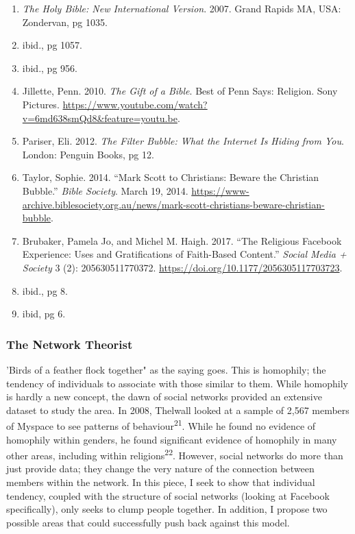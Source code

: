 \documentclass[]{article}
\providecommand{\tightlist}{%
  \setlength{\itemsep}{0pt}\setlength{\parskip}{0pt}}
\begin{document}
\begin{enumerate}
\def\labelenumi{\arabic{enumi}.}
\setcounter{enumi}{11}
\tightlist
\item
  \emph{The Holy Bible: New International Version}. 2007. Grand Rapids
  MA, USA: Zondervan, pg 1035.
\item
  ibid., pg 1057.
\item
  ibid., pg 956.
\item
  Jillette, Penn. 2010. \emph{The Gift of a Bible}. Best of Penn Says:
  Religion. Sony Pictures.
  \url{https://www.youtube.com/watch?v=6md638smQd8\&feature=youtu.be}.
\item
  Pariser, Eli. 2012. \emph{The Filter Bubble: What the Internet Is
  Hiding from You}. London: Penguin Books, pg 12.
\item
  Taylor, Sophie. 2014. ``Mark Scott to Christians: Beware the Christian
  Bubble.'' \emph{Bible Society}. March 19, 2014.
  \url{https://www-archive.biblesociety.org.au/news/mark-scott-christians-beware-christian-bubble}.
\item
  Brubaker, Pamela Jo, and Michel M. Haigh. 2017. ``The Religious
  Facebook Experience: Uses and Gratifications of Faith-Based Content.''
  \emph{Social Media + Society} 3 (2): 205630511770372.
  \url{https://doi.org/10.1177/2056305117703723}.
\item
  ibid., pg 8.
\item
  ibid, pg 6.
\end{enumerate}

\hypertarget{the-network-theorist}{%
\subsubsection{The Network Theorist}\label{the-network-theorist}}

'Birds of a feather flock together" as the saying goes. This is
homophily; the tendency of individuals to associate with those similar
to them. While homophily is hardly a new concept, the dawn of social
networks provided an extensive dataset to study the area. In 2008,
Thelwall looked at a sample of 2,567 members of Myspace to see patterns
of behaviour\textsuperscript{21}. While he found no evidence of
homophily within genders, he found significant evidence of homophily in
many other areas, including within religions\textsuperscript{22}.
However, social networks do more than just provide data; they change the
very nature of the connection between members within the network. In
this piece, I seek to show that individual tendency, coupled with the
structure of social networks (looking at Facebook specifically), only
seeks to clump people together. In addition, I propose two possible
areas that could successfully push back against this model.
\end{document}
